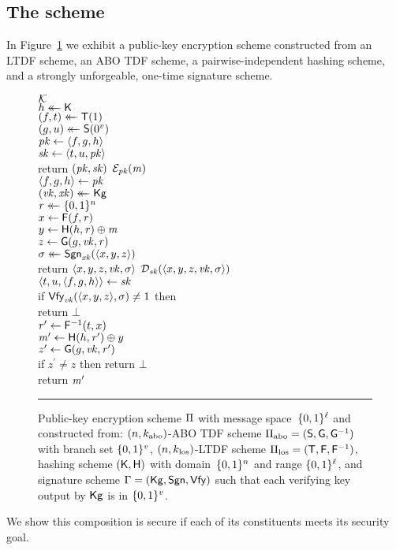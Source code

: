 \subsection{The scheme}
In Figure~\ref{fig-proto} we exhibit a public-key encryption scheme constructed
from an LTDF scheme, an ABO TDF scheme, a pairwise-independent hashing scheme,
and a strongly unforgeable, one-time signature scheme.
%
\begin{figure}[t]
  {
    \underline{$\mathcal{K}$}\\[2pt]
      $h \mathrel{\leftarrow\mkern-14mu\leftarrow} \mathsf{K}$\\
      $(f, t) \mathrel{\leftarrow\mkern-14mu\leftarrow} \mathsf{T}(1)$\\
      $(g, u) \mathrel{\leftarrow\mkern-14mu\leftarrow} \mathsf{S}(0^v)$\\
      $\mathit{pk} \gets \langle f, g, h \rangle$\\
      $\mathit{sk} \gets \langle t, u, \mathit{pk} \rangle$\\
      return $(\mathit{pk}, \mathit{sk})$
  }
  {
    \underline{$\mathcal{E}_{\mathit{pk}}(\mathit{m})$}\\[2pt]
      $\langle f, g, h \rangle \gets \mathit{pk}$\\
      $(\mathit{vk}, \mathit{xk}) \mathrel{\leftarrow\mkern-14mu\leftarrow} \mathsf{Kg}$\\
      $\mathit{r} \mathrel{\leftarrow\mkern-14mu\leftarrow} \{0,1\}^n$\\
      $x \gets \mathsf{F}(f,\mathit{r})$\\
      $y \gets \mathsf{H}(h,\mathit{r}) \oplus \mathit{m}$\\
      $z \gets \mathsf{G}(g, \mathit{vk}, \mathit{r})$\\
      $\sigma \mathrel{\leftarrow\mkern-14mu\leftarrow} \mathsf{Sgn}_{\mathit{xk}}(\langle x,y,z \rangle)$\\
      return $\langle x,y,z,\mathit{vk},\sigma \rangle$
  }
  {
    \underline{$\mathcal{D}_{\mathit{sk}}(\langle x,y,z,\mathit{vk},\sigma \rangle)$}\\[2pt]
      $\langle t, u, \langle f, g, h \rangle \rangle \gets \mathit{sk}$\\
      if $\mathsf{Vfy}_{\mathit{vk}}(\langle x,y,z \rangle,\sigma) \ne 1$ then\\
      \tab return $\bot$\\
      $\mathit{r}^\prime \gets \mathsf{F}^{-1}(t, x)$\\
      $\mathit{m}^\prime \gets \mathsf{H}(h,\mathit{r}^\prime) \oplus y$\\
      $z^\prime \gets \mathsf{G}(g,\mathit{vk},\mathit{r}^\prime)$\\
      if $z^\prime \ne z$ then
        return $\bot$\\
      return $\mathit{m}^\prime$
  }
  \caption{Public-key encryption scheme $\mathrm{\Pi}$ with message
  space~$\{0,1\}^\ell$ and constructed from:
  $(n,k_\abo)$-ABO TDF scheme $\tdfscheme_\abo = (\abogen,\abof,\abofinv)$ with branch set $\{0,1\}^v$,
  $(n,k_\los)$-LTDF scheme $\tdfscheme_\los = (\losgen,\losf,\losfinv)$,
  hashing scheme $(\mathsf{K},\mathsf{H})$ with domain~$\{0,1\}^n$ and range
  $\{0,1\}^\ell$, and
  signature scheme $\mathrm{\Gamma} = (\mathsf{Kg}, \mathsf{Sgn}, \mathsf{Vfy})$ such that each
  verifying key output by $\mathsf{Kg}$ is in $\{0,1\}^v$.
  }
  \label{fig-proto}
  \vspace{6pt}
  \hrule
\end{figure}
%
We show this composition is \indcca secure if each of its constituents meets its
security goal.

